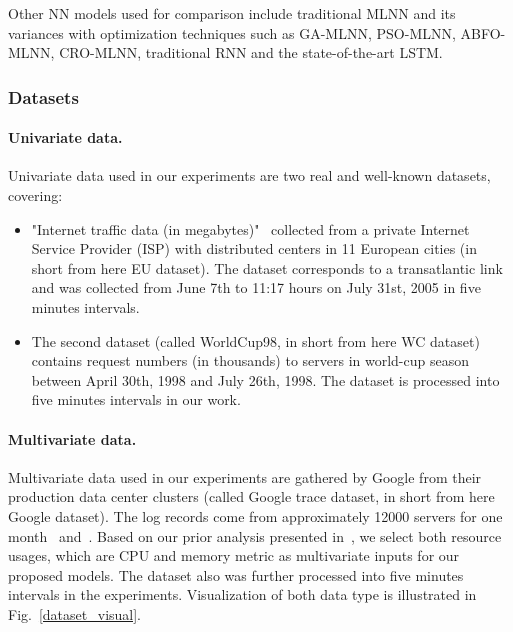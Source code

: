 \documentclass[smallcondensed, natbib]{svjour3}     %
\begin{document}
Other NN models used for comparison include traditional MLNN and its variances with optimization techniques such as GA-MLNN, PSO-MLNN, ABFO-MLNN, CRO-MLNN, traditional RNN and the state-of-the-art LSTM.

\subsubsection{Datasets}
\label{dataset}

\paragraph{\textbf{Univariate data.}} Univariate data used in our experiments are two real and well-known datasets, covering:

\begin{itemize}
	\item "Internet traffic data (in megabytes)"~\citep{ref_cortez} collected from a private Internet Service Provider (ISP) with distributed centers in 11 European cities (in short from here EU dataset). The dataset corresponds to a transatlantic link and was collected from June 7th to 11:17 hours on July 31st, 2005 in five minutes intervals. 
	\item The second dataset (called WorldCup98, in short from here WC dataset) contains request numbers (in thousands) to servers in world-cup season between April 30th, 1998 and July 26th, 1998. The dataset is processed into five minutes intervals in our work.
\end{itemize}

\paragraph{\textbf{Multivariate data.}} Multivariate data used in our experiments are gathered by Google from their production data center clusters (called Google trace dataset, in short from here Google dataset). The log records come from approximately 12000 servers for one month~\citep{ref_google_trace} and~\citep{reiss2011google}. Based on our prior analysis presented in~\citep{ref_thieu}, we select both resource usages, which are CPU and memory metric as multivariate inputs for our proposed models. The dataset also was further processed into five minutes intervals in the experiments. Visualization of both data type is illustrated in Fig.~\ref{dataset_visual}.
\end{document}
